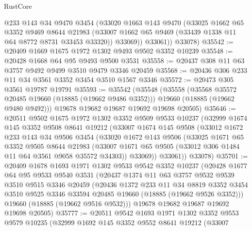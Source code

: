 \begin{lexlean}{RustCore}
\begin{coremodule}
          @233
          @143
          @34
          @9470
          @3454
          (@33020
            @1663
            @143
            @9470
            (@33025
              @1662
              @65
              @3352
              @9469
              @8644
              @21983
              (@33007 @1662 @65 @9469 (@33439 @1338 @11 @64 @8772 @8731 @33453 @33320))
              @33069))
          @33061))
      @33078)
@35542 := @20409 @1669 @1675 @1972 @1302 @9493 @9502 @3352 @10239
@35548 := @20428 @1668 @64 @95 @9493 @9500 @3531
@35558 := @20437 @308 @11 @63 @3757 @9492 @9499 @3510 @9479 @3346 @20459
@35568 := @20436 @306 @233 @11 @34 @3561 @3352 @3454 @3510 @1567 @3346
@35572 := @20473 @305 @3561 @19787 @19791
@35593 := @35542
    (@35548
      (@35558
        (@35568 @35572 @20485 @19660 (@18885 (@19662 @9486 @3352)))
        @19660
        (@18885 (@19662 @9480 @9492)))
      @19678
      @19682
      @19687
      @19692
      @19698
      @20505)
@35646 := @20511
    @9502
    @1675
    @1972
    @1302
    @3352
    @9509
    @9533
    @10237
    (@32999
      @1674
      @145
      @3352
      @9508
      @8641
      @19212
      (@33007
        @1674
        @145
        @9508
        (@33012
          @1672
          @233
          @143
          @34
          @9506
          @3454
          (@33020
            @1672
            @143
            @9506
            (@33025
              @1671
              @65
              @3352
              @9505
              @8644
              @21983
              (@33007 @1671 @65 @9505 (@33012 @306 @1484 @11 @64 @3561 @9058 @35572 @34303))
              @33069))
          @33061))
      @33078)
@35701 := @20409
    @1678
    @1693
    @1971
    @1302
    @9533
    @9542
    @3352
    @10237
    (@20428
      @1677
      @64
      @95
      @9533
      @9540
      @3531
      (@20437
        @1374
        @11
        @63
        @3757
        @9532
        @9539
        @3510
        @9515
        @3346
        @20459
        (@20436
          @1372
          @233
          @11
          @34
          @8819
          @3352
          @3454
          @3510
          @9525
          @3346
          @33594
          @20485
          @19660
          (@18885 (@19662 @9526 @3352)))
        @19660
        (@18885 (@19662 @9516 @9532)))
      @19678
      @19682
      @19687
      @19692
      @19698
      @20505)
@35777 := @20511
    @9542
    @1693
    @1971
    @1302
    @3352
    @9553
    @9579
    @10235
    (@32999
      @1692
      @145
      @3352
      @9552
      @8641
      @19212
      (@33007

\end{coremodule}
\end{lexlean}
